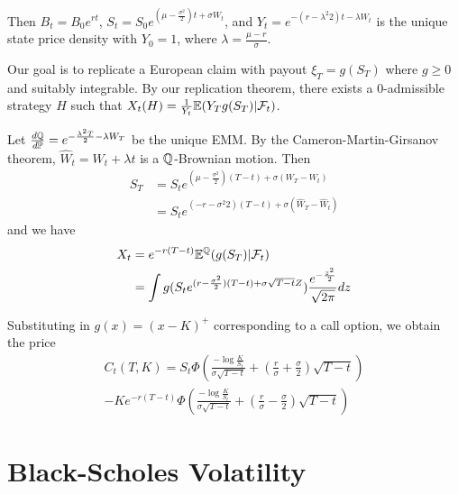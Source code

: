 Then $B_t = B_{0} e^{rt}$, $S_{t} = S_{0} e^{(\mu -
  \frac{\sigma^{2}}{2})t + \sigma W_{t}}$, and $Y_{t} = e^{-(r -
  \lambda^{2}{2})t - \lambda W_{t}}$ is the unique state price density
with $Y_{0} = 1$, where $\lambda = \frac{\mu - r}{\sigma}$.

Our goal is to replicate a European claim with payout $\xi_{T} =
g(S_{T})$ where $g \geq 0$ and suitably integrable.  By our
replication theorem, there exists a 0-admissible strategy $H$ such
that $X_{t}(H) = \frac{1}{Y_{t}} \E{Y_{T} g(S_{T}) |
  \mathcal{F}_{t}}$.

Let $\frac{d\Q}{d\Prob} = e^{-\frac{\lambda^{2}T}{2} - \lambda W_{T}}$
be the unique EMM.  By the Cameron-Martin-Girsanov theorem, $\hat
W_{t} = W_{t} + \lambda t$ is a $\Q$-Brownian motion.  Then
\begin{align}
  \label{eq:89}
  S_{T} &= S_{t} e^{(\mu - \frac{\sigma^{2}}{2})(T-t) + \sigma(W_{T} -
    W_{t})} \\
  &= S_{t} e^{(-r - \sigma^{2}{2})(T-t) + \sigma(\hat W_{T} - \hat W_{t})}
\end{align} and we have
\begin{align}
  \label{eq:88}
  X_{t} &= e^{-r(T-t)} \mathbb{E}^{\Q}(g(S_{T}) | \mathcal{F}_{t}) \\
  &= \int g(S_{t} e^{(r - \frac{\sigma^{2}}{2})(T-t) +
    \sigma\sqrt{T-t} Z}) \frac{e^{-\frac{z^{2}}{2}}}{\sqrt{2 \pi}} dz
\end{align}

Substituting in $g(x) = (x - K)^{+}$ corresponding to a call option,
we obtain the price
\begin{multline}
  \label{eq:90}
  C_{t}(T, K) = S_{t} \Phi(\frac{-\log \frac{K}{S_{t}}}{\sigma \sqrt{T
      - t}} + (\frac{r}{\sigma} + \frac{\sigma}{2})\sqrt{T-t}) \\ -
  Ke^{-r(T-t)} \Phi(\frac{-\log \frac{K}{S_{t}}}{\sigma \sqrt{T-t}} +
  (\frac{r}{\sigma} - \frac{\sigma}{2}) \sqrt{T-t})
\end{multline}


\section{Black-Scholes Volatility}
\label{sec:black-schol-volat}

